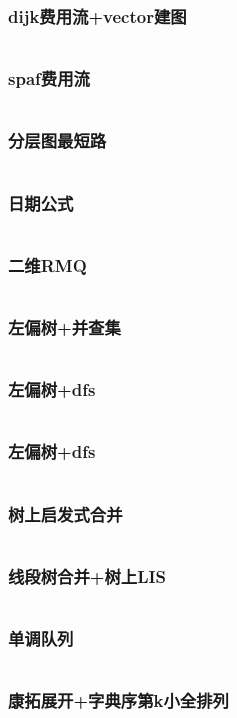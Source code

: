 \documentclass[a4paper,12pt]{article}
\begin{document}
\subsubsection{dijk费用流+vector建图}
\inputminted[]{c++}{code/hdu6611.cpp}
\subsubsection{spaf费用流}
\inputminted[]{c++}{code/mcmf.cpp}
\subsubsection{分层图最短路}
\inputminted[]{c++}{code/bzoj2763.cpp}
\subsubsection{日期公式}
\inputminted[]{c++}{code/nc886G.cpp}
\subsubsection{二维RMQ}
\inputminted[]{c++}{code/2dRMQ.cpp}
\subsubsection{左偏树+并查集}
\inputminted[]{c++}{code/luoguP3377.cpp}
\subsubsection{左偏树+dfs}
\inputminted[]{c++}{code/luoguP1552.cpp}
\subsubsection{左偏树+dfs}
\inputminted[]{c++}{code/luoguP3261.cpp}
\subsubsection{树上启发式合并}
\inputminted[]{c++}{code/cf600E.cpp}
\subsubsection{线段树合并+树上LIS}
\inputminted[]{c++}{code/cf490F.cpp}
\subsubsection{单调队列}
\inputminted[]{c++}{code/hdu3530.cpp}
\subsubsection{康拓展开+字典序第k小全排列}
\inputminted[]{c++}{code/kangtuo.cpp}
\end{document}
